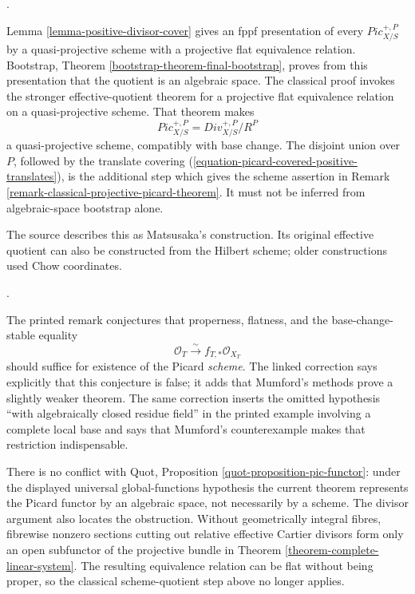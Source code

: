 \begin{remark}
\label{remark-classical-positive-divisor-quotient}
\begin{reference}
\cite[Expos\'e 232, Section 5 and Remark 5.1, pp. 154--155]{FGA}.
\end{reference}
Lemma \ref{lemma-positive-divisor-cover} gives an fppf presentation of every
$\mathit{Pic}^{+,P}_{X/S}$ by a quasi-projective scheme with a projective
flat equivalence relation. Bootstrap, Theorem
\ref{bootstrap-theorem-final-bootstrap}, proves from this presentation that
the quotient is an algebraic space. The classical proof invokes the stronger
effective-quotient theorem for a projective flat equivalence relation on a
quasi-projective scheme. That theorem makes
$$
\mathit{Pic}^{+,P}_{X/S} = \mathit{Div}^{+,P}_{X/S}/R^P
$$
a quasi-projective scheme, compatibly with base change. The disjoint union
over $P$, followed by the translate covering
(\ref{equation-picard-covered-positive-translates}), is the additional step
which gives the scheme assertion in Remark
\ref{remark-classical-projective-picard-theorem}. It must not be inferred
from algebraic-space bootstrap alone.

The source describes this as Matsusaka's construction. Its original
effective quotient can also be constructed from the Hilbert scheme; older
constructions used Chow coordinates.
\end{remark}

\begin{remark}
\label{remark-corrected-picard-existence-boundary}
\begin{reference}
\cite[Expos\'e 232, Remark 5.2, pp. 155--156;
correction to Expos\'e 232, p. 303]{FGA}.
\end{reference}
The printed remark conjectures that properness, flatness, and the
base-change-stable equality
$$
\mathcal{O}_T \xrightarrow{\sim} f_{T, *}\mathcal{O}_{X_T}
$$
should suffice for existence of the Picard \emph{scheme}. The linked
correction says explicitly that this conjecture is false; it adds that
Mumford's methods prove a slightly weaker theorem. The same correction
inserts the omitted hypothesis ``with algebraically closed residue field''
in the printed example involving a complete local base and says that
Mumford's counterexample makes that restriction indispensable.

There is no conflict with Quot, Proposition
\ref{quot-proposition-pic-functor}: under the displayed universal
global-functions hypothesis the current theorem represents the Picard
functor by an algebraic space, not necessarily by a scheme. The divisor
argument also locates the obstruction. Without geometrically integral
fibres, fibrewise nonzero sections cutting out relative effective Cartier
divisors form only an open subfunctor of the projective bundle in Theorem
\ref{theorem-complete-linear-system}. The resulting equivalence relation can
be flat without being proper, so the classical scheme-quotient step above no
longer applies.
\end{remark}

